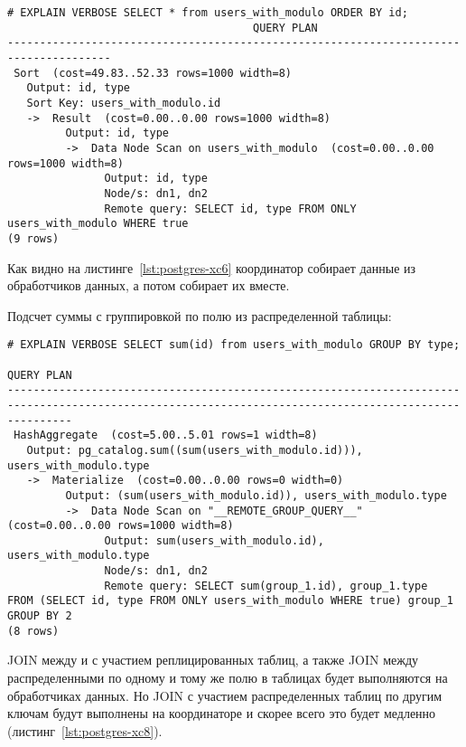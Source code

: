 \begin{lstlisting}[label=lst:postgres-xc6,caption=Выборка записей из распределенной таблицы]
# EXPLAIN VERBOSE SELECT * from users_with_modulo ORDER BY id;
                                      QUERY PLAN
--------------------------------------------------------------------------------------
 Sort  (cost=49.83..52.33 rows=1000 width=8)
   Output: id, type
   Sort Key: users_with_modulo.id
   ->  Result  (cost=0.00..0.00 rows=1000 width=8)
         Output: id, type
         ->  Data Node Scan on users_with_modulo  (cost=0.00..0.00 rows=1000 width=8)
               Output: id, type
               Node/s: dn1, dn2
               Remote query: SELECT id, type FROM ONLY users_with_modulo WHERE true
(9 rows)
\end{lstlisting}

Как видно на листинге~\ref{lst:postgres-xc6} координатор собирает данные из обработчиков данных, а потом собирает их вместе.

Подсчет суммы с группировкой по полю из распределенной таблицы:

\begin{lstlisting}[label=lst:postgres-xc7,caption=Выборка записей из распределенной таблицы]
# EXPLAIN VERBOSE SELECT sum(id) from users_with_modulo GROUP BY type;
                                                                      QUERY PLAN
------------------------------------------------------------------------------------------------------------------------------------------------------
 HashAggregate  (cost=5.00..5.01 rows=1 width=8)
   Output: pg_catalog.sum((sum(users_with_modulo.id))), users_with_modulo.type
   ->  Materialize  (cost=0.00..0.00 rows=0 width=0)
         Output: (sum(users_with_modulo.id)), users_with_modulo.type
         ->  Data Node Scan on "__REMOTE_GROUP_QUERY__"  (cost=0.00..0.00 rows=1000 width=8)
               Output: sum(users_with_modulo.id), users_with_modulo.type
               Node/s: dn1, dn2
               Remote query: SELECT sum(group_1.id), group_1.type  FROM (SELECT id, type FROM ONLY users_with_modulo WHERE true) group_1 GROUP BY 2
(8 rows)
\end{lstlisting}

JOIN между и с участием реплицированных таблиц, а также JOIN между распределенными по одному и тому же полю в таблицах будет выполняются на обработчиках данных. Но JOIN с участием распределенных таблиц по другим ключам будут выполнены на координаторе и скорее всего это будет медленно (листинг~\ref{lst:postgres-xc8}).

